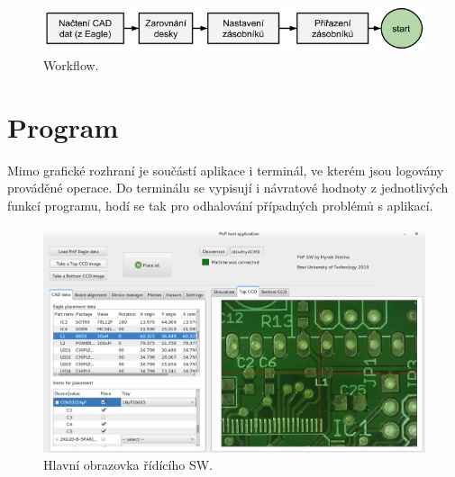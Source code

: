 \begin{figure}[h!]
  \centering
    \includegraphics[width=1\linewidth]{obrazky/workflow.png}%
    \caption{Workflow.}
\end{figure}

\section{Program}

Mimo grafické rozhraní je součástí aplikace i terminál, ve kterém jsou logovány prováděné operace. Do terminálu se vypisují i návratové hodnoty z jednotlivých funkcí programu, hodí se tak pro odhalování případných problémů s aplikací.


\begin{figure}[h!]
  \centering
    \includegraphics[width=1\linewidth]{obrazky/sw.png}%
    \caption{Hlavní obrazovka řídícího SW.}
\end{figure}


